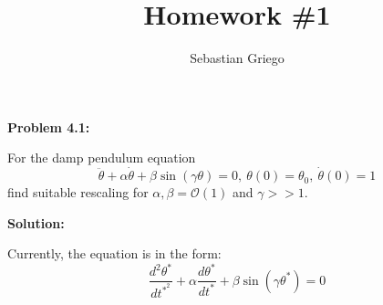 \documentclass[12pt]{article}
\newenvironment{problem}[1]{
\textbf{Problem #1:}
}{
\rmfamily \vspace{1em}
}
\newenvironment{solution}{
\textbf{Solution:}

}{

\vspace{2em}
}
\begin{document}
\title{Homework \#1}  %
\author{Sebastian Griego}  %

\begin{problem}{4.1}
    For the damp pendulum equation
    \[
        \ddot{\theta} + \alpha \dot{\theta} + \beta \sin(\gamma \theta) = 0, \: \theta(0) = \theta_0, \: \dot{\theta}(0) = 1
    \]
    find suitable rescaling for \(\alpha, \beta = \mathcal{O}(1)\) and \(\gamma > > 1\).
\end{problem}

\begin{solution}
    Currently, the equation is in the form:
    \[
        \frac{d^2\theta^*}{dt^{*^2}} + \alpha \frac{d\theta^*}{dt^*} + \beta \sin(\gamma \theta^*) = 0
    \]

\end{solution}
\end{document}
